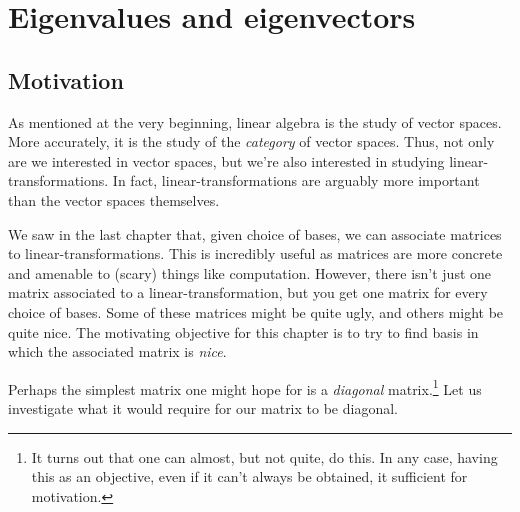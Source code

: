 \chapter{Eigenvalues and eigenvectors}

\section{Motivation}\label{sct4.1}

As mentioned at the very beginning, linear algebra is the study of vector spaces.  More accurately, it is the study of the \emph{category} of vector spaces.  Thus, not only are we interested in vector spaces, but we're also interested in studying linear-transformations.  In fact, linear-transformations are arguably more important than the vector spaces themselves.

We saw in the last chapter that, given choice of bases, we can associate matrices to linear-transformations.  This is incredibly useful as matrices are more concrete and amenable to (scary) things like computation.  However, there isn't just one matrix associated to a linear-transformation, but you get one matrix for every choice of bases.  Some of these matrices might be quite ugly, and others might be quite nice.  The motivating objective for this chapter is to try to find basis in which the associated matrix is \emph{nice}.

Perhaps the simplest matrix one might hope for is a \emph{diagonal} matrix.\footnote{It turns out that one can almost, but not quite, do this.  In any case, having this as an objective, even if it can't always be obtained, it sufficient for motivation.}  Let us investigate what it would require for our matrix to be diagonal.

